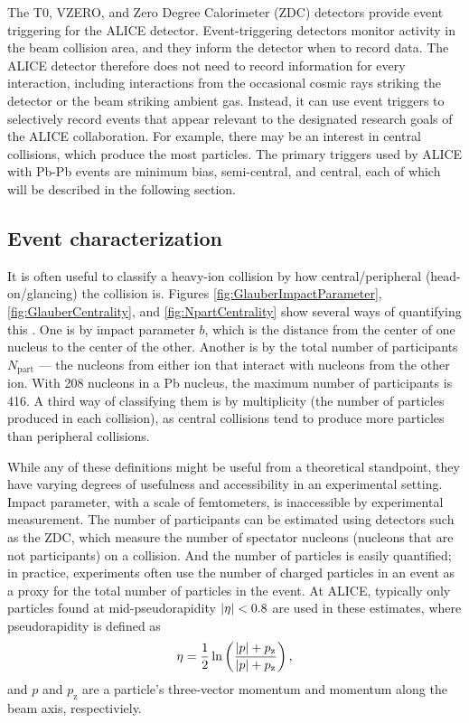 The T0, VZERO, and Zero Degree Calorimeter (ZDC) detectors provide event triggering for the ALICE detector.
Event-triggering detectors monitor activity in the beam collision area, and they inform the detector when to record data.
The ALICE detector therefore does not need to record information for every interaction, including interactions from the occasional cosmic rays striking the detector or the beam striking ambient gas.
Instead, it can use event triggers to selectively record events that appear relevant to the designated research goals of the ALICE collaboration.
For example, there may be an interest in central collisions, which produce the most particles.
The primary triggers used by ALICE with Pb-Pb events are minimum bias, semi-central, and central, each of which will be described in the following section.

\subsection{Event characterization}
\label{sec:EventCharacterization}

It is often useful to classify a heavy-ion collision by how central/peripheral (head-on/glancing) the collision is.
Figures \ref{fig:GlauberImpactParameter}, \ref{fig:GlauberCentrality}, and \ref{fig:NpartCentrality} show several ways of quantifying this \cite{Abelev:2013xaa, Aamodt:2010pa}.
One is by impact parameter $b$, which is the distance from the center of one nucleus to the center of the other.
Another is by the total number of participants $N_\mathrm{part}$ --- the nucleons from either ion that interact with nucleons from the other ion.
With 208 nucleons in a Pb nucleus, the maximum number of participants is 416.
A third way of classifying them is by multiplicity (the number of particles produced in each collision), as central collisions tend to produce more particles than peripheral collisions.

While any of these definitions might be useful from a theoretical standpoint, they have varying degrees of usefulness and accessibility in an experimental setting.
Impact parameter, with a scale of femtometers, is inaccessible by experimental measurement.
The number of participants can be estimated using detectors such as the ZDC, which measure the number of spectator nucleons (nucleons that are not participants) on a collision.
And the number of particles is easily quantified; in practice, experiments often use the number of charged particles in an event as a proxy for the total number of particles in the event.
At ALICE, typically only particles found
at mid-pseudorapidity $\left\lvert\eta\right\rvert < 0.8$ are used in these estimates, where pseudorapidity is defined as
\begin{equation}
\label{eq:Pseudorapidity}
\eta = \frac{1}{2} \ln \left( \frac{\left\lvert p\right\rvert + p_{\mathrm{z}}}{\left\lvert p\right\rvert + p_{\mathrm{z}}} \right),
\end{equation}
and $p$ and $p_\mathrm{z}$ are a particle's three-vector momentum and momentum along the beam axis, respectiviely.

